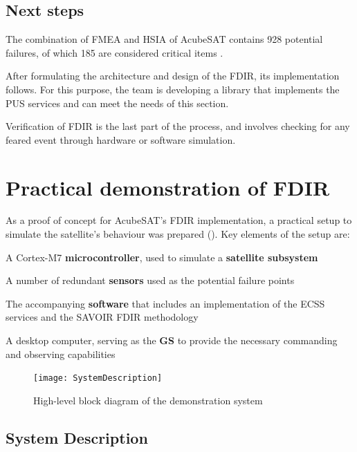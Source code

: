 \documentclass[a4paper,nobib]{tufte-book}
\begin{document}
\section{Next steps}
The combination of \acs{FMEA} and \acs{HSIA} of AcubeSAT contains 928 potential failures, of which 185 are considered critical items \autocite{retselis_acubesat_fmea_2020}.

After formulating the architecture and design of the \acs{FDIR}, its implementation follows. For this purpose, the team is developing a library that implements the \acs{PUS} services and can meet the needs of this section.

Verification of \acs{FDIR} is the last part of the process, and involves checking for any feared event through hardware or software simulation.

\chapter{Practical demonstration of \ac{FDIR}}
\label{cap:practical}

As a proof of concept for AcubeSAT's \ac{FDIR} implementation, a practical setup to simulate the satellite's behaviour was prepared (). Key elements of the setup are:
\begin{compactitem}
	\item A Cortex-M7 \textbf{microcontroller}, used to simulate a \textbf{satellite subsystem}
	\item A number of redundant \textbf{sensors} used as the potential failure points
	\item The accompanying \textbf{software} that includes an implementation of the \acs{ECSS} services and the \acs{SAVOIR} \acs{FDIR} methodology
	\item A desktop computer, serving as the \textbf{\acl{GS}} to provide the necessary commanding and observing capabilities
\end{compactitem}

\begin{figure}[h]
	\texttt{[image: SystemDescription]}
	\caption{High-level block diagram of the demonstration system}
	\label{fig:block}
\end{figure}

\pagebreak[4]
\section{System Description}
\end{document}
